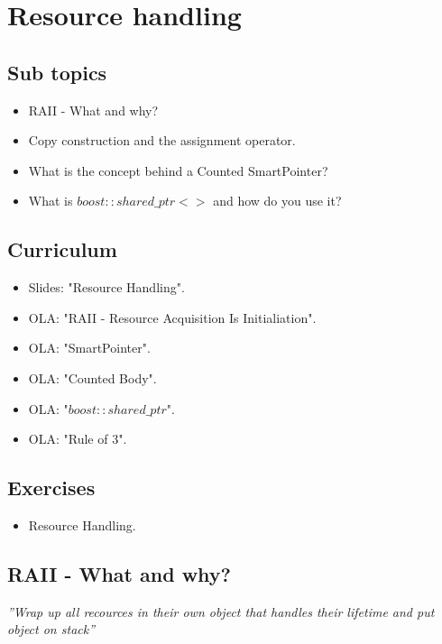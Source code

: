 \section{Resource handling}

\subsection{Sub topics}

\begin{itemize}
	\item RAII - What and why?
	\item Copy construction and the assignment operator.
	\item What is the concept behind a Counted SmartPointer?
	\item What is $boost::shared\_ptr<>$ and how do you use it?
\end{itemize}

\subsection{Curriculum}

\begin{itemize}
	\item Slides: "Resource Handling".
	\item OLA: "RAII - Resource Acquisition Is Initialiation".
	\item OLA: "SmartPointer".
	\item OLA: "Counted Body".
	\item OLA: "$boost::shared\_ptr$".
	\item OLA: "Rule of 3".
\end{itemize}

\subsection{Exercises}

\begin{itemize}
	\item Resource Handling.
\end{itemize}

\subsection{RAII - What and why?}\label{sec:raii}
\textit{''Wrap up all recources in their own object that handles their lifetime and put object on stack''}\\

